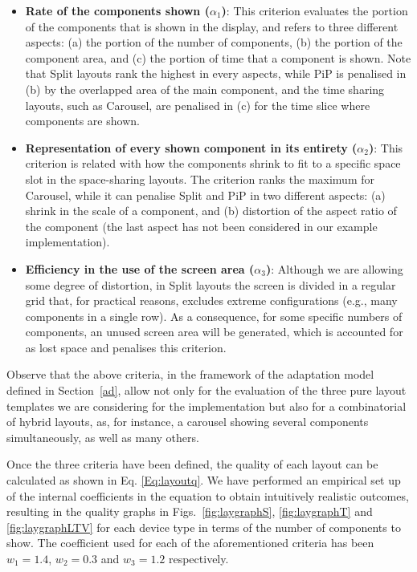 \begin{itemize}
	\item \textbf{Rate of the components shown ($\alpha_1$)}: This criterion evaluates the portion of the components that is shown in the display, and refers to three different aspects: (a) the portion of the number of components, (b) the portion of the component area, and (c) the portion of time that a component is shown.
	Note that Split layouts rank the highest in every aspects, while PiP is penalised in (b) by the overlapped area of the main component, and the time sharing layouts, such as Carousel, are penalised in (c) for the time slice where components are shown.
	\item \textbf{Representation of every shown component in its entirety ($\alpha_2$)}: This criterion is related with how the components shrink to fit to a specific space slot in the space-sharing layouts. The criterion ranks the maximum for Carousel, while it can penalise Split and PiP in two different aspects: (a) shrink in the scale of a component, and (b) distortion of the aspect ratio of the component (the last aspect has not been considered in our example implementation).
	\item \textbf{Efficiency in the use of the screen area ($\alpha_3$)}: Although we are allowing some degree of distortion, in Split layouts the screen is divided in a regular grid that, for practical reasons, excludes extreme configurations (e.g., many components in a single row). As a consequence, for some specific numbers of components, an unused screen area will be generated, which is accounted for as lost space and penalises this criterion.  
\end{itemize}

Observe that the above criteria, in the framework of the adaptation model defined in Section~\ref{ad}, allow not only for the evaluation of the three pure layout templates we are considering for the implementation but also for a combinatorial of hybrid layouts, as, for instance, a carousel showing several components simultaneously, as well as many others. 

Once the three criteria have been defined, the quality of each layout can be calculated as shown in Eq. \ref{Eq:layoutq}. 
We have performed an empirical set up of the internal coefficients in the equation to obtain intuitively realistic outcomes, resulting in the quality graphs in Figs.~\ref{fig:laygraphS}, \ref{fig:laygraphT} and \ref{fig:laygraphLTV} for each device type in terms of the number of components to show.
The coefficient used for each of the aforementioned criteria has been $w_1=1.4$, $w_2=0.3$ and $w_3=1.2$ respectively.


